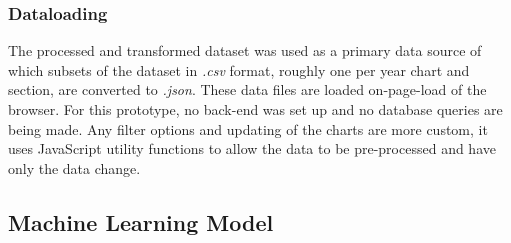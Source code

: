 \subsubsection{Dataloading}
The processed and transformed dataset was used as a primary data source of which subsets of the dataset in \textit{.csv} format, roughly one per year chart and section, are converted to \textit{.json}. These data files are loaded on-page-load of the browser. For this prototype, no back-end was set up and no database queries are being made. Any filter options and updating of the charts are more custom, it uses JavaScript utility functions to allow the data to be pre-processed and have only the data change. 

\subsection{Machine Learning Model}
